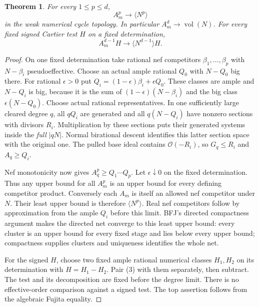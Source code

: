 \documentclass[11pt]{article}
\newtheorem{theorem}{Theorem}
\newcommand{\vol}{\operatorname{vol}}
\newcommand{\OO}{\mathcal O}
\begin{document}
\begin{theorem}\label{products}
For every $1\leq p\leq d$,
\[
                       A_m^p\longrightarrow\langle N^p\rangle
                                                        \tag{3}
\]
in the weak numerical cycle topology. In particular
$A_m^d\to\vol(N)$. For every fixed signed Cartier test $H$ on
a fixed determination,
\[
 A_m^{d-1}H\longrightarrow\langle N^{d-1}\rangle H.     \tag{4}
\]
\end{theorem}
\begin{proof}
On one fixed determination take rational nef competitors
$\beta_1,\ldots,\beta_p$ with $N-\beta_i$ pseudoeffective.
Choose an actual ample rational $Q_0$ with $N-Q_0$ big there.
For rational $\epsilon>0$ put
$Q_i=(1-\epsilon)\beta_i+\epsilon Q_0$.
These classes are ample and $N-Q_i$ is big, because it is the sum
of $(1-\epsilon)(N-\beta_i)$ and the big class
$\epsilon(N-Q_0)$. Choose actual rational representatives.
In one sufficiently large cleared degree $q$, all $qQ_i$ are
generated and all $q(N-Q_i)$ have nonzero sections with divisors
$R_i$. Multiplication by these sections puts their generated
systems inside the \emph{full} $|qN|$.
Normal birational descent identifies this latter section space
with the original one. The pulled base ideal contains
$\OO(-R_i)$, so $G_q\leq R_i$ and $A_q\geq Q_i$.

Nef monotonicity now gives $A_q^p\geq Q_1\cdots Q_p$.
Let $\epsilon\downarrow0$ on the fixed determination.
Thus any upper bound for all $A_m^p$ is an upper bound for every
defining competitor product. Conversely each $A_m$ is itself an
allowed nef competitor under $N$. Their least upper bound is
therefore $\langle N^p\rangle$.
Real nef competitors follow by approximation from the ample
$Q_i$ before this limit. BFJ's directed compactness argument
\cite[Lemmas 2.6--2.7]{BFJ} makes the directed net converge to
this least upper bound: every cluster is an upper bound for every
fixed stage and lies below every upper bound; compactness supplies
clusters and uniqueness identifies the whole net.

For the signed $H$, choose two fixed ample rational numerical
classes $H_1,H_2$ on its determination with $H=H_1-H_2$.
Pair (3) with them separately, then subtract.
The test and its decomposition are fixed before the degree limit.
There is no effective-order comparison against a signed test.
The top assertion follows from the algebraic Fujita equality.
\end{proof}
\end{document}
